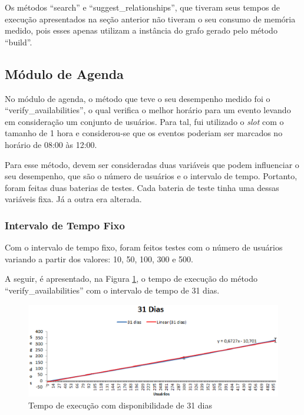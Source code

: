 Os métodos ``search'' e ``suggest\_relationships'', que tiveram seus tempos de execução apresentados na seção anterior não tiveram o seu consumo de memória medido, pois esses apenas utilizam a instância do grafo gerado pelo método ``build''.

\subsection{Módulo de Agenda}

No módulo de agenda, o método que teve o seu desempenho medido foi o ``verify\_availabilities'', o qual verifica o melhor horário para um evento levando em consideração um conjunto de usuários. Para tal, fui utilizado o \textit{slot} com o tamanho de 1 hora e considerou-se que os eventos poderiam ser marcados no horário de 08:00 às 12:00.

Para esse método, devem ser consideradas duas variáveis que podem influenciar o seu desempenho, que são o número de usuários e o intervalo de tempo. Portanto, foram feitas duas baterias de testes. Cada bateria de teste tinha uma dessas variáveis fixa. Já a outra era alterada.

\subsubsection{Intervalo de Tempo Fixo}

Com o intervalo de tempo fixo, foram feitos testes com o número de usuários variando a partir dos valores: 10, 50, 100, 300 e 500.

A seguir, é apresentado, na Figura \ref{31dias_tempo}, o tempo de execução do método ``verify\_availabilities'' com o intervalo de tempo de 31 dias.

\begin{figure}[!h]
	\centering
	\includegraphics[scale=0.55]{figuras/resultados/graficos/31_dias_tempo.eps}
	\caption[Tempo de execução com disponibilidade de 31 dias]{Tempo de execução com disponibilidade de 31 dias}
	\label{31dias_tempo}
\end{figure}

